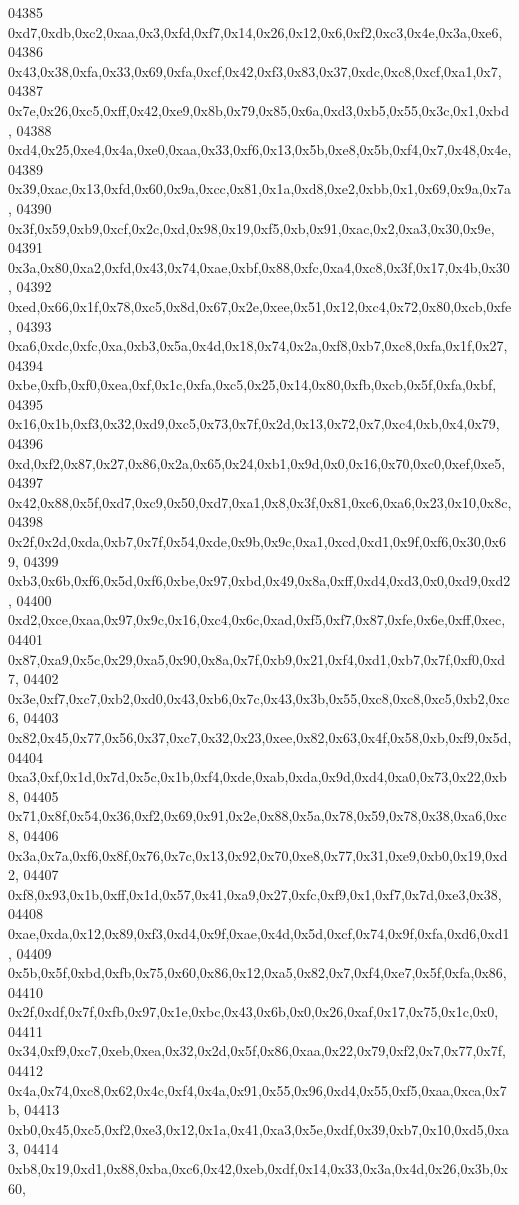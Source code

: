 \begin{DoxyCode}
04385   0xd7,0xdb,0xc2,0xaa,0x3,0xfd,0xf7,0x14,0x26,0x12,0x6,0xf2,0xc3,0x4e,0x3a,0xe6,
04386   0x43,0x38,0xfa,0x33,0x69,0xfa,0xcf,0x42,0xf3,0x83,0x37,0xdc,0xc8,0xcf,0xa1,0x7,
04387   0x7e,0x26,0xc5,0xff,0x42,0xe9,0x8b,0x79,0x85,0x6a,0xd3,0xb5,0x55,0x3c,0x1,0xbd,
04388   0xd4,0x25,0xe4,0x4a,0xe0,0xaa,0x33,0xf6,0x13,0x5b,0xe8,0x5b,0xf4,0x7,0x48,0x4e,
04389   0x39,0xac,0x13,0xfd,0x60,0x9a,0xcc,0x81,0x1a,0xd8,0xe2,0xbb,0x1,0x69,0x9a,0x7a,
04390   0x3f,0x59,0xb9,0xcf,0x2c,0xd,0x98,0x19,0xf5,0xb,0x91,0xac,0x2,0xa3,0x30,0x9e,
04391   0x3a,0x80,0xa2,0xfd,0x43,0x74,0xae,0xbf,0x88,0xfc,0xa4,0xc8,0x3f,0x17,0x4b,0x30,
04392   0xed,0x66,0x1f,0x78,0xc5,0x8d,0x67,0x2e,0xee,0x51,0x12,0xc4,0x72,0x80,0xcb,0xfe,
04393   0xa6,0xdc,0xfc,0xa,0xb3,0x5a,0x4d,0x18,0x74,0x2a,0xf8,0xb7,0xc8,0xfa,0x1f,0x27,
04394   0xbe,0xfb,0xf0,0xea,0xf,0x1c,0xfa,0xc5,0x25,0x14,0x80,0xfb,0xcb,0x5f,0xfa,0xbf,
04395   0x16,0x1b,0xf3,0x32,0xd9,0xc5,0x73,0x7f,0x2d,0x13,0x72,0x7,0xc4,0xb,0x4,0x79,
04396   0xd,0xf2,0x87,0x27,0x86,0x2a,0x65,0x24,0xb1,0x9d,0x0,0x16,0x70,0xc0,0xef,0xe5,
04397   0x42,0x88,0x5f,0xd7,0xc9,0x50,0xd7,0xa1,0x8,0x3f,0x81,0xc6,0xa6,0x23,0x10,0x8c,
04398   0x2f,0x2d,0xda,0xb7,0x7f,0x54,0xde,0x9b,0x9c,0xa1,0xcd,0xd1,0x9f,0xf6,0x30,0x69,
04399   0xb3,0x6b,0xf6,0x5d,0xf6,0xbe,0x97,0xbd,0x49,0x8a,0xff,0xd4,0xd3,0x0,0xd9,0xd2,
04400   0xd2,0xce,0xaa,0x97,0x9c,0x16,0xc4,0x6c,0xad,0xf5,0xf7,0x87,0xfe,0x6e,0xff,0xec,
04401   0x87,0xa9,0x5c,0x29,0xa5,0x90,0x8a,0x7f,0xb9,0x21,0xf4,0xd1,0xb7,0x7f,0xf0,0xd7,
04402   0x3e,0xf7,0xc7,0xb2,0xd0,0x43,0xb6,0x7c,0x43,0x3b,0x55,0xc8,0xc8,0xc5,0xb2,0xc6,
04403   0x82,0x45,0x77,0x56,0x37,0xc7,0x32,0x23,0xee,0x82,0x63,0x4f,0x58,0xb,0xf9,0x5d,
04404   0xa3,0xf,0x1d,0x7d,0x5c,0x1b,0xf4,0xde,0xab,0xda,0x9d,0xd4,0xa0,0x73,0x22,0xb8,
04405   0x71,0x8f,0x54,0x36,0xf2,0x69,0x91,0x2e,0x88,0x5a,0x78,0x59,0x78,0x38,0xa6,0xc8,
04406   0x3a,0x7a,0xf6,0x8f,0x76,0x7c,0x13,0x92,0x70,0xe8,0x77,0x31,0xe9,0xb0,0x19,0xd2,
04407   0xf8,0x93,0x1b,0xff,0x1d,0x57,0x41,0xa9,0x27,0xfc,0xf9,0x1,0xf7,0x7d,0xe3,0x38,
04408   0xae,0xda,0x12,0x89,0xf3,0xd4,0x9f,0xae,0x4d,0x5d,0xcf,0x74,0x9f,0xfa,0xd6,0xd1,
04409   0x5b,0x5f,0xbd,0xfb,0x75,0x60,0x86,0x12,0xa5,0x82,0x7,0xf4,0xe7,0x5f,0xfa,0x86,
04410   0x2f,0xdf,0x7f,0xfb,0x97,0x1e,0xbc,0x43,0x6b,0x0,0x26,0xaf,0x17,0x75,0x1c,0x0,
04411   0x34,0xf9,0xc7,0xeb,0xea,0x32,0x2d,0x5f,0x86,0xaa,0x22,0x79,0xf2,0x7,0x77,0x7f,
04412   0x4a,0x74,0xc8,0x62,0x4c,0xf4,0x4a,0x91,0x55,0x96,0xd4,0x55,0xf5,0xaa,0xca,0x7b,
04413   0xb0,0x45,0xc5,0xf2,0xe3,0x12,0x1a,0x41,0xa3,0x5e,0xdf,0x39,0xb7,0x10,0xd5,0xa3,
04414   0xb8,0x19,0xd1,0x88,0xba,0xc6,0x42,0xeb,0xdf,0x14,0x33,0x3a,0x4d,0x26,0x3b,0x60,

\end{DoxyCode}
